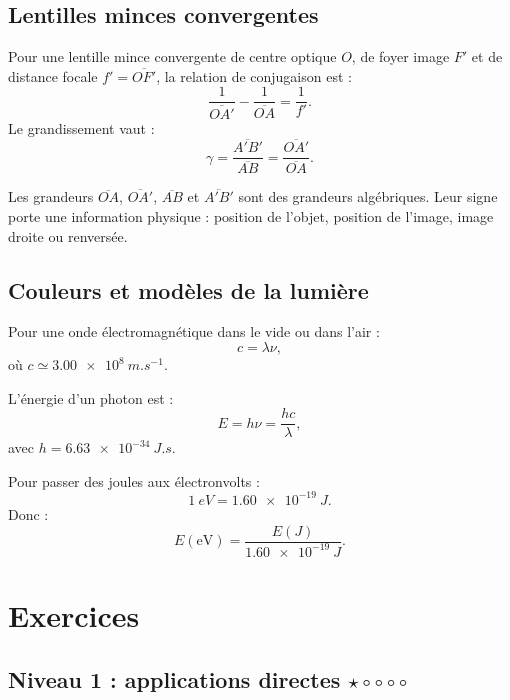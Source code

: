 \documentclass[11pt,a4paper]{article}
\newcommand{\eV}{\mathrm{eV}}
\begin{document}
\subsection{Lentilles minces convergentes}

\begin{retenirbox}
Pour une lentille mince convergente de centre optique $O$, de foyer image $F'$ et de distance focale $f'=\overline{OF'}$, la relation de conjugaison est :
\[
\frac{1}{\overline{OA'}}-\frac{1}{\overline{OA}}=\frac{1}{f'}.
\]
Le grandissement vaut :
\[
\gamma=\frac{\overline{A'B'}}{\overline{AB}}=\frac{\overline{OA'}}{\overline{OA}}.
\]
\end{retenirbox}

\begin{vigilancebox}
Les grandeurs $\overline{OA}$, $\overline{OA'}$, $\overline{AB}$ et $\overline{A'B'}$ sont des grandeurs algébriques. Leur signe porte une information physique : position de l'objet, position de l'image, image droite ou renversée.
\end{vigilancebox}

\subsection{Couleurs et modèles de la lumière}

\begin{retenirbox}
Pour une onde électromagnétique dans le vide ou dans l'air :
\[
c=\lambda \nu,
\]
où $c\simeq \SI{3.00e8}{m.s^{-1}}$.

L'énergie d'un photon est :
\[
E=h\nu=\frac{hc}{\lambda},
\]
avec $h=\SI{6.63e-34}{J.s}$.
\end{retenirbox}

\begin{methodbox}
Pour passer des joules aux électronvolts :
\[
\SI{1}{eV}=\SI{1.60e-19}{J}.
\]
Donc :
\[
E(\eV)=\frac{E(\si{J})}{\SI{1.60e-19}{J}}.
\]
\end{methodbox}

\newpage

\section{Exercices}

\subsection{Niveau 1 : applications directes \texorpdfstring{$\star\circ\circ\circ\circ$}{*}}
\end{document}
